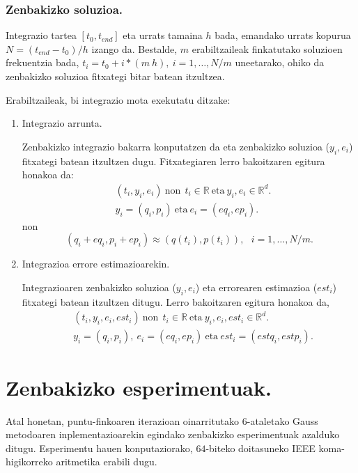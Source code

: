 \subsubsection*{Zenbakizko soluzioa.}  

Integrazio tartea $[t_0,t_{end}]$ eta urrats tamaina $h$ bada, emandako urrats kopurua $N=(t_{end}-t_0)/h$ izango da. Bestalde, $m$ erabiltzaileak finkatutako soluzioen frekuentzia bada, $t_i=t_0+i*(m \ h), \ i=1,\dots,N/m$ uneetarako, ohiko da zenbakizko soluzioa fitxategi bitar batean itzultzea.

Erabiltzaileak, bi integrazio mota exekutatu ditzake:
\begin{enumerate}
\item Integrazio arrunta.

Zenbakizko integrazio bakarra konputatzen da eta zenbakizko soluzioa ($y_i,e_i$) fitxategi batean itzultzen dugu. Fitxategiaren lerro bakoitzaren egitura honakoa da:
\begin{align*}
& (t_i,y_i,e_i) \ \text{non} \ \ t_i \in \mathbb{R} \ \text{eta} \ y_i,e_i \in \mathbb{R}^d.\\
& y_i=(q_i,p_i) \ \text{eta} \ e_i=(eq_i,ep_i).
\end{align*}
non
\begin{equation*}
(q_i+eq_i,p_i+ep_i)\approx(q(t_i),p(t_i)), \ \ \ i=1,\dots,N/m.
\end{equation*}

\item Integrazioa errore estimazioarekin.

Integrazioaren zenbakizko soluzioa ($y_i,e_i$) eta errorearen estimazioa ($est_i$)  fitxategi batean itzultzen ditugu. Lerro bakoitzaren egitura honakoa da,
\begin{align*}
& (t_i,y_i,e_i,est_i) \ \text{non} \ \ t_i \in \mathbb{R} \ \text{eta} \ y_i,e_i,est_i \in \mathbb{R}^d.\\
&  y_i=(q_i,p_i), \ e_i=(eq_i,ep_i) \ \text{eta} \ est_i=(estq_i,estp_i).
\end{align*}

\end{enumerate}


\clearpage


\section{Zenbakizko esperimentuak.}

Atal honetan, puntu-finkoaren iterazioan oinarritutako $6$-ataletako Gauss metodoaren inplementazioarekin egindako zenbakizko esperimentuak azalduko ditugu. Esperimentu hauen konputaziorako, $64$-biteko doitasuneko IEEE koma-higikorreko aritmetika erabili dugu.

